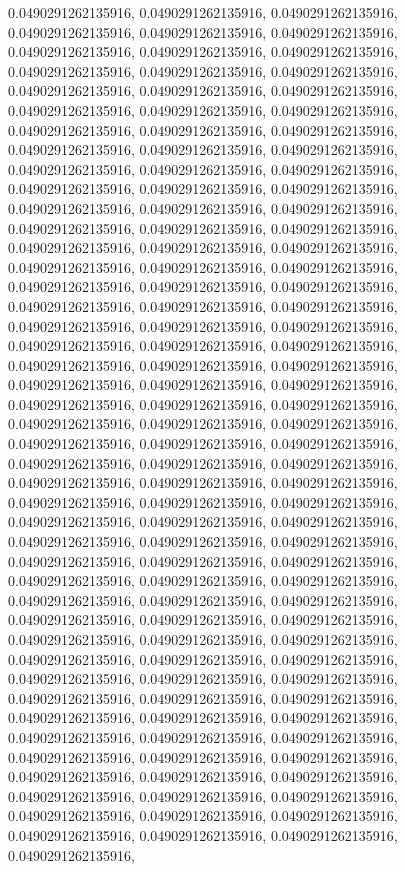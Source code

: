 \documentclass[
  ,man]{apa6}
\begin{document}
0.0490291262135916, 0.0490291262135916, 0.0490291262135916, 0.0490291262135916, 0.0490291262135916, 0.0490291262135916, 0.0490291262135916, 0.0490291262135916, 0.0490291262135916, 0.0490291262135916, 0.0490291262135916, 0.0490291262135916, 0.0490291262135916, 0.0490291262135916, 0.0490291262135916, 0.0490291262135916, 0.0490291262135916, 0.0490291262135916, 0.0490291262135916, 0.0490291262135916, 0.0490291262135916, 0.0490291262135916, 0.0490291262135916, 0.0490291262135916, 0.0490291262135916, 0.0490291262135916,
0.0490291262135916, 0.0490291262135916, 0.0490291262135916, 0.0490291262135916, 0.0490291262135916, 0.0490291262135916, 0.0490291262135916, 0.0490291262135916, 0.0490291262135916, 0.0490291262135916, 0.0490291262135916, 0.0490291262135916, 0.0490291262135916, 0.0490291262135916, 0.0490291262135916, 0.0490291262135916, 0.0490291262135916, 0.0490291262135916, 0.0490291262135916, 0.0490291262135916, 0.0490291262135916, 0.0490291262135916, 0.0490291262135916, 0.0490291262135916, 0.0490291262135916, 0.0490291262135916,
0.0490291262135916, 0.0490291262135916, 0.0490291262135916, 0.0490291262135916, 0.0490291262135916, 0.0490291262135916, 0.0490291262135916, 0.0490291262135916, 0.0490291262135916, 0.0490291262135916, 0.0490291262135916, 0.0490291262135916, 0.0490291262135916, 0.0490291262135916, 0.0490291262135916, 0.0490291262135916, 0.0490291262135916, 0.0490291262135916, 0.0490291262135916, 0.0490291262135916, 0.0490291262135916, 0.0490291262135916, 0.0490291262135916, 0.0490291262135916, 0.0490291262135916, 0.0490291262135916,
0.0490291262135916, 0.0490291262135916, 0.0490291262135916, 0.0490291262135916, 0.0490291262135916, 0.0490291262135916, 0.0490291262135916, 0.0490291262135916, 0.0490291262135916, 0.0490291262135916, 0.0490291262135916, 0.0490291262135916, 0.0490291262135916, 0.0490291262135916, 0.0490291262135916, 0.0490291262135916, 0.0490291262135916, 0.0490291262135916, 0.0490291262135916, 0.0490291262135916, 0.0490291262135916, 0.0490291262135916, 0.0490291262135916, 0.0490291262135916, 0.0490291262135916, 0.0490291262135916,
0.0490291262135916, 0.0490291262135916, 0.0490291262135916, 0.0490291262135916, 0.0490291262135916, 0.0490291262135916, 0.0490291262135916, 0.0490291262135916, 0.0490291262135916, 0.0490291262135916, 0.0490291262135916, 0.0490291262135916, 0.0490291262135916, 0.0490291262135916, 0.0490291262135916, 0.0490291262135916, 0.0490291262135916, 0.0490291262135916, 0.0490291262135916, 0.0490291262135916, 0.0490291262135916, 0.0490291262135916, 0.0490291262135916, 0.0490291262135916, 0.0490291262135916, 0.0490291262135916,
\end{document}
